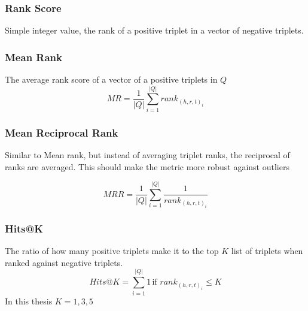 \subsubsection{Rank Score}
Simple integer value, the rank of a positive triplet in a vector of negative triplets.

\subsubsection{Mean Rank}
The average rank score of a vector of a positive triplets in $Q$
\[
MR = \frac{1}{|Q|}\sum_{i = 1}^{|Q|}rank_{(h, r, t)_i}
\]

\subsubsection{Mean Reciprocal Rank}
Similar to Mean rank, but instead of averaging triplet ranks, the reciprocal of ranks are averaged.
This should make the metric more robust against outliers ~\cite{ampligraph}

\[
    MRR = \frac{1}{|Q|}\sum_{i = 1}^{|Q|}\frac{1}{rank_{(h, r, t)_i}}
\]

\subsubsection{Hits@K}
The ratio of how many positive triplets make it to the top $K$ list of triplets when ranked against negative triplets.
\[
    Hits@K = \sum_{i = 1}^{|Q|} 1 \, \text{if } rank_{(h, r, t)_i} \leq K
\]
In this thesis $K={1,3,5}$